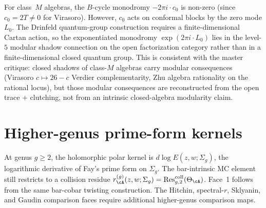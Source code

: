 \begin{remark}
\label{rem:g1sf-class-m-no-qg}
For class~$M$ algebras, the $B$-cycle monodromy
$-2\pi i \cdot c_0$ is non-zero (since $c_0 = 2T \neq 0$ for
Virasoro). However, $c_0$ acts on conformal blocks by the zero mode
$L_0$. The Drinfeld quantum-group construction requires a
finite-dimensional Cartan action, so the exponentiated monodromy
$\exp(2\pi i \cdot L_0)$ lies in the level-$5$ modular shadow
connection on the open factorization category rather than in a
finite-dimensional closed quantum group. This is consistent with the
master critique: closed shadows of class-$M$ algebras carry modular
consequences (Virasoro $c\mapsto 26-c$ Verdier complementarity, Zhu
algebra rationality on the rational locus), but those modular
consequences are reconstructed from the open trace + clutching, not
from an intrinsic closed-algebra modularity claim.
\end{remark}



\section{Higher-genus prime-form kernels}
\label{sec:g1sf-outlook}

At genus $g \geq 2$, the holomorphic polar kernel is
$d\log E(z,w;\Sigma_g)$, the logarithmic derivative of Fay's prime
form on $\Sigma_g$. The bar-intrinsic MC element still restricts to a
collision residue
$r_\cA^{(g)}(z,w;\Sigma_g)=
\operatorname{Res}^{\mathrm{coll}}_{g,2}(\Theta_\cA)$.
Face~1 follows from the same bar-cobar twisting construction. The
Hitchin, spectral-$r$, Sklyanin, and Gaudin comparison faces require
additional higher-genus comparison maps.

